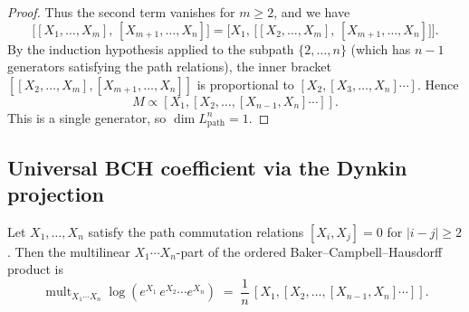 \begin{proof}
Thus the second term vanishes for $m\ge 2$, and we have
\[
\bigl[[X_1,\ldots,X_m],\,[X_{m+1},\ldots,X_n]\bigr]
=
\bigl[X_1,\,\bigl[[X_2,\ldots,X_m],\,[X_{m+1},\ldots,X_n]\bigr]\bigr].
\]
By the induction hypothesis applied to the subpath $\{2,\ldots,n\}$
(which has $n-1$ generators satisfying the path relations), the inner
bracket $[[X_2,\ldots,X_m],[X_{m+1},\ldots,X_n]]$ is proportional to
$[X_2,[X_3,\ldots,X_n]\cdots]$. Hence
\[
M \propto [X_1,[X_2,\ldots,[X_{n-1},X_n]\cdots]].
\]
This is a single generator, so $\dim L_{\mathrm{path}}^n=1$.
\end{proof}

\subsection{Universal BCH coefficient via the Dynkin projection}

\begin{theorem}
\label{thm:dynkin-bch-path}
Let $X_1,\ldots,X_n$ satisfy the path commutation relations
$[X_i,X_j]=0$ for $|i-j|\ge 2$. Then the multilinear
$X_1\cdots X_n$-part of the ordered Baker--Campbell--Hausdorff product is
\begin{equation}\label{eq:bch-path-coeff}
\operatorname{mult}_{X_1\cdots X_n}
\log(e^{X_1}\,e^{X_2}\cdots e^{X_n})
\;=\;
\frac{1}{n}\,[X_1,[X_2,\ldots,[X_{n-1},X_n]\cdots]].
\end{equation}
\end{theorem}

